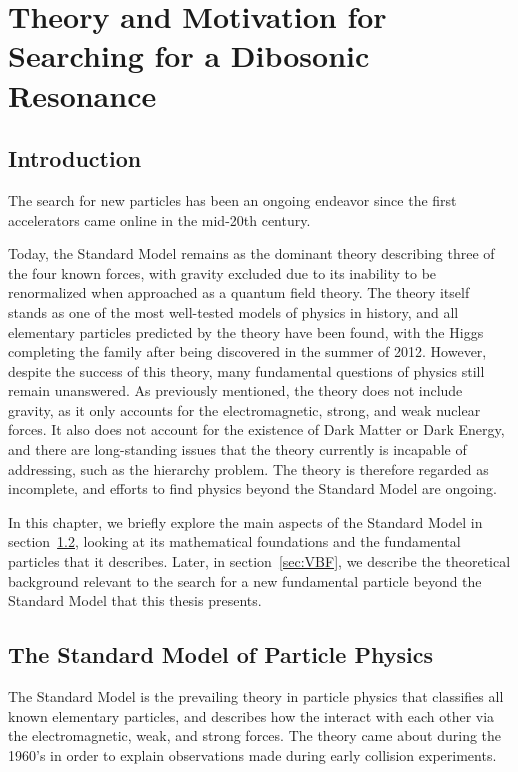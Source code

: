 
\chapter{Theory and Motivation for Searching for a Dibosonic Resonance}
\label{chap:theory}

\section{Introduction}

The search for new particles has been an ongoing endeavor since the first accelerators came online in the mid-20th century.


Today, the Standard Model remains as the dominant theory describing three of the four known forces, with gravity excluded due to its inability to be renormalized when approached as a quantum field theory.
The theory itself stands as one of the most well-tested models of physics in history, and all elementary particles predicted by the theory have been found, with the Higgs completing the family after being discovered in the summer of 2012.
However, despite the success of this theory, many fundamental questions of physics still remain unanswered.
As previously mentioned, the theory does not include gravity, as it only accounts for the electromagnetic, strong, and weak nuclear forces.
It also does not account for the existence of Dark Matter or Dark Energy, and there are long-standing issues that the theory currently is incapable of addressing, such as the hierarchy problem.
The theory is therefore regarded as incomplete, and efforts to find physics beyond the Standard Model are ongoing.

In this chapter, we briefly explore the main aspects of the Standard Model in section~\ref{sec:SM}, looking at its mathematical foundations and the fundamental particles that it describes.
Later, in section~\ref{sec:VBF}, we describe the theoretical background relevant to the search for a new fundamental particle beyond the Standard Model that this thesis presents.

\section{The Standard Model of Particle Physics}
\label{sec:SM}

The Standard Model is the prevailing theory in particle physics that classifies all known elementary particles, and describes how the interact with each other via the electromagnetic, weak, and strong forces.
The theory came about during the 1960's in order to explain observations made during early collision experiments\footnotemark.

